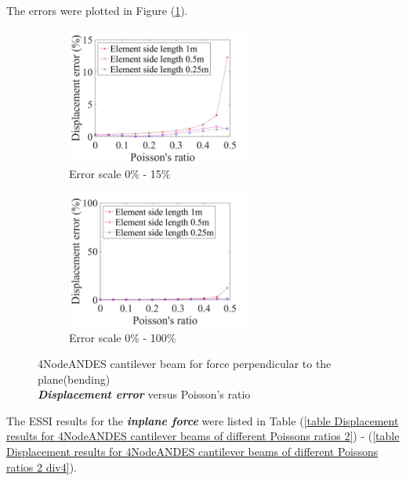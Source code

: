 \documentclass[fleqn,11pt]{article}
\begin{document}
The errors were plotted in Figure (\ref{table Displacement error 4NodeANDES cantilever beam for different Poisson ratio}).


\begin{figure}[H]
  \begin{subfigure}{0.5\textwidth}
    \centering
    \includegraphics[width=6cm]{../Figure-files/error4andes_beam_dif_poisson_disp_bend_div.jpeg}
    \caption{Error scale 0\% - 15\%}
  \end{subfigure}
  \begin{subfigure}{0.5\textwidth}
    \centering
    \includegraphics[width=6cm]{../Figure-files/error4andes_beam_dif_poisson_disp_bend_div100.jpeg}
    \caption{Error scale 0\% - 100\%}
  \end{subfigure}
  \captionsetup{justification=centering,margin=2cm}
  \caption{4NodeANDES cantilever beam for force perpendicular to the plane(bending)\\
      \emph{\textbf{Displacement error}}   versus   Poisson's ratio}
  \label{table Displacement error 4NodeANDES cantilever beam for different Poisson ratio}
\end{figure}






The ESSI results for the \textbf{\emph{inplane force}} were listed in Table (\ref{table Displacement results for 4NodeANDES cantilever beams of different Poissons ratios 2}) - (\ref{table Displacement results for 4NodeANDES cantilever beams of different Poissons ratios 2 div4}).
\end{document}
